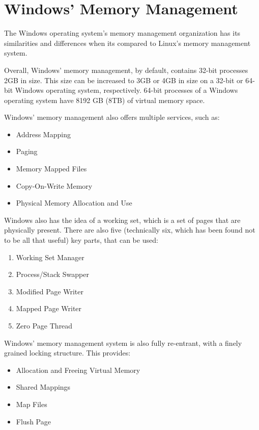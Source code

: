 \documentclass[letterpaper,10pt,onecolumn]{IEEEtran}
\begin{document}
\section*{Windows' Memory Management}
\par
The Windows operating system's memory management organization has its similarities and differences when its compared to Linux's memory management system.
\par
Overall, Windows' memory management, by default, contains 32-bit processes 2GB in size. This size can be increased to 3GB or 4GB in size on a 32-bit or 64-bit Windows operating system, respectively.  64-bit processes of a Windows operating system have 8192 GB (8TB) of virtual memory space.

\par
Windows' memory management also offers multiple services, such as:
\begin{itemize}
	\item Address Mapping
	\item Paging
	\item Memory Mapped Files
	\item Copy-On-Write Memory
	\item Physical Memory Allocation and Use
\end{itemize}

\par
Windows also has the idea of a working set, which is a set of pages that are physically present. There are also five (technically six, which has been found not to be all that useful) key parts, that can be used:
\begin{enumerate}
	\item Working Set Manager
	\item Process/Stack Swapper
	\item Modified Page Writer
	\item Mapped Page Writer
	\item Zero Page Thread
\end{enumerate}

\par
Windows' memory management system is also fully re-entrant, with a finely grained locking structure. This provides:
\begin{itemize}
	\item Allocation and Freeing Virtual Memory
	\item Shared Mappings
	\item Map Files
	\item Flush Page
\end{itemize}
\end{document}
